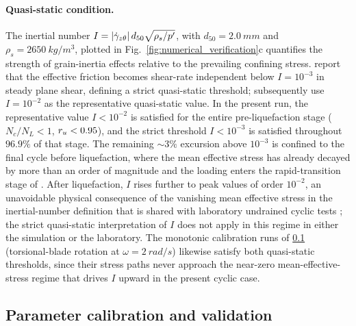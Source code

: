 \paragraph{Quasi-static condition.}
The inertial number $I=|\dot\gamma_{z\theta}|\,d_{50}\sqrt{\rho_s/p^\prime}$, with $d_{50}=\SI{2.0}{mm}$ and $\rho_s=\SI{2650}{kg/m^3}$, plotted in Fig.~\ref{fig:numerical_verification}c quantifies the strength of grain-inertia effects relative to the prevailing confining stress. \citet{GDRMiDi2004} report that the effective friction becomes shear-rate independent below $I = 10^{-3}$ in steady plane shear, defining a strict quasi-static threshold; \citet{daCruzEmam2005} subsequently use $I = 10^{-2}$ as the representative quasi-static value. In the present run, the representative value $I < 10^{-2}$ is satisfied for the entire pre-liquefaction stage ($N_c/N_L < 1$, $r_u < 0.95$), and the strict threshold $I < 10^{-3}$ is satisfied throughout $96.9\%$ of that stage. The remaining $\sim 3\%$ excursion above $10^{-3}$ is confined to the final cycle before liquefaction, where the mean effective stress has already decayed by more than an order of magnitude and the loading enters the rapid-transition stage of \citet{Wang2025inertial}. After liquefaction, $I$ rises further to peak values of order $10^{-2}$, an unavoidable physical consequence of the vanishing mean effective stress in the inertial-number definition that is shared with laboratory undrained cyclic tests \citep{Wang2025inertial}; the strict quasi-static interpretation of $I$ does not apply in this regime in either the simulation or the laboratory. The monotonic calibration runs of \cref{subsec:calibration_validation} (torsional-blade rotation at $\omega = \SI{2}{rad/s}$) likewise satisfy both quasi-static thresholds, since their stress paths never approach the near-zero mean-effective-stress regime that drives $I$ upward in the present cyclic case.

\FloatBarrier

\subsection{Parameter calibration and validation}
\label{subsec:calibration_validation}

